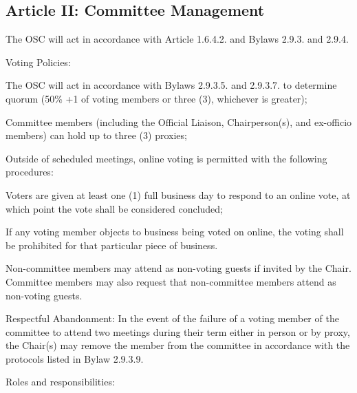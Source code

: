 \subsection{Article II: Committee Management}
\begin{longenum}[ label*=\thesubsection.\arabic*., align=left] 
	\item The OSC will act in accordance with Article 1.6.4.2. and Bylaws 2.9.3. and 2.9.4.
	\item Voting Policies:	
		\begin{longenum}[label*=\arabic*., align=left]
		\item The OSC will act in accordance with Bylaws 2.9.3.5. and 2.9.3.7. to determine quorum (50\% +1 of voting members or three (3), whichever is greater); 
		\item Committee members (including the Official Liaison, Chairperson(s), and ex-officio members) can hold up to three (3) proxies;
		\item Outside of scheduled meetings, online voting is permitted with the following procedures:	
			\begin{longenum}[label*=\arabic*., align=left]			
			\item Voters are given at least one (1) full business day to respond to an online vote, at which point the vote shall be considered concluded;
			\item If any voting member objects to business being voted on online, the voting shall be prohibited for that particular piece of business.
			\end{longenum}
		\end{longenum}
	\item Non-committee members may attend as non-voting guests if invited by the Chair. Committee members may also request that non-committee members attend as non-voting guests.
	\item Respectful Abandonment: In the event of the failure of a voting member of the committee to attend two meetings during their term either in person or by proxy, the Chair(s) may remove the member from the committee in accordance with the protocols listed in Bylaw 2.9.3.9.
	\item Roles and responsibilities:
		\begin{longenum}[label*=\arabic*., align=left]


\end{longenum}
\end{longenum}
